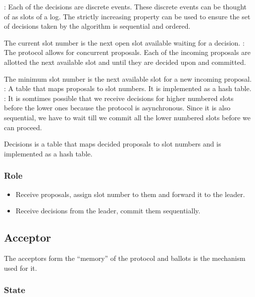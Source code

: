 \begin{itemize}
    : Each of the decisions are discrete events.
    These discrete events can be thought of as slots of a log. The strictly
    increasing property can be used to ensure the set of decisions taken by
    the algorithm is sequential and ordered.

    The current slot number is the next open slot available waiting for a
    decision.
    : The protocol allows for concurrent proposals.
    Each of the incoming proposals are allotted the next available slot and
    until they are decided upon and committed.

    The minimum slot number is the next available slot for a new incoming
    proposal.
    : A table that maps proposals to slot numbers. It is
    implemented as a hash table.
    : It is somtimes possible that we receive decisions for
    higher numbered slots before the lower ones because the protocol is
    asynchronous. Since it is also sequential, we have to wait till we
    commit all the lower numbered slots before we can proceed.

   Decisions is a table that maps decided proposals to slot numbers and is
   implemented as a hash table.
\end{itemize}

\subsubsection{Role}

\begin{itemize}
  \item Receive proposals, assign slot number to them and forward it to the
    leader.
  \item Receive decisions from the leader, commit them sequentially.
\end{itemize}

\subsection{Acceptor}

The acceptors form the ``memory'' of the protocol and ballots is the
mechanism used for it.

\subsubsection{State}

